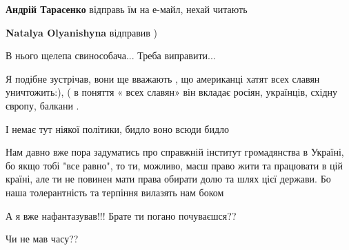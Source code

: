 \begin{itemize}
\begin{itemize}
\textbf{Андрій Тарасенко} відправь їм на е-майл, нехай читають

 
\textbf{Natalya Olyanishyna} відправив )
\end{itemize}

 
В нього щелепа свинособача... Треба виправити...

 

Я подібне зустрічав, вони ще вважають , що американці хатят всех славян
уничтожить:), ( в поняття « всех славян» він вкладає росіян, українців, східну
європу, балкани .

І немає тут ніякої політики, бидло воно всюди бидло


 

Нам давно вже пора задуматись про справжній інститут громадянства в Україні, бо
якщо тобі "все равно", то ти, можливо, маєш право жити та працювати в цій
країні, але ти не повинен мати права обирати долю та шлях цієї держави. Бо наша
толерантність та терпіння вилазять нам боком 🙁

 

А я вже нафантазував!!! Брате ти погано почуваєшся??

Чи не мав часу??


\end{itemize}
